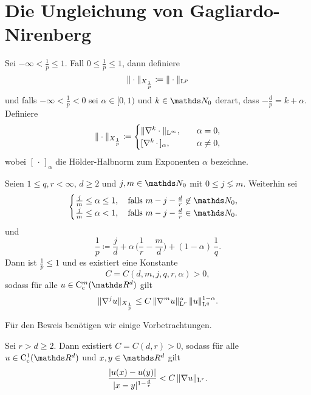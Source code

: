 \chapter{Die Ungleichung von Gagliardo-Nirenberg}

\begin{ntion}
  Sei $-\infty < \frac{1}{p} \leq 1$.
  Fall $0 \leq \frac{1}{p} \leq 1$, dann definiere
  $$
  \| \cdot \|_{X_{\frac{1}{p}}} \coloneqq \| \cdot \|_{\mathrm{L}^p}
  $$
  und falls $-\infty < \frac{1}{p} < 0$ sei $\alpha \in [0,1)$ und $k \in \N_0$ derart, dass $-\frac{d}{p} = k + \alpha$. Definiere
  $$
  \| \cdot \|_{X_{\frac{1}{p}}} \coloneqq 
  \begin{cases} 
    \| \nabla^k \cdot \|_{\mathrm{L}^\infty}, \quad &\alpha = 0, \\ [ \nabla^k \, \cdot \, ]_\alpha, \quad &\alpha \neq 0,
  \end{cases}
  $$
  wobei $[\,\cdot\,]_\alpha$ die Hölder-Halbnorm zum Exponenten $\alpha$ bezeichne.
\end{ntion}

\begin{hsatz}
  \label{hsatz:gagliardoNirenberg}
  Seien $1 \leq q,r < \infty$, $d \geq 2$ und $j,m \in \N_0$ mit $0 \leq j \lneq m$.
  Weiterhin sei
  $$
  \begin{cases}
    \frac{j}{m} \leq \alpha \leq 1, \quad \text{falls } m - j - \frac{d}{r} \not\in \N_0, \\
    \frac{j}{m} \leq \alpha < 1, \quad \text{falls } m - j - \frac{d}{r} \in \N_0.
  \end{cases}
    $$
    und
    $$
    \frac{1}{p} \coloneqq \frac{j}{d} + \alpha\, \Big( \frac{1}{r} - \frac{m}{d} \Big) + (1 - \alpha) \, \frac{1}{q}.
    $$
    Dann ist $\frac{1}{p} \leq 1$ und es existiert eine Konstante
    $$
    C = C(d,m,j,q,r,\alpha) > 0,
    $$
    sodass für alle $u \in \CC_{\cc}^m(\R^d)$ gilt
    $$
    \| \nabla^j u\|_{X_{\frac{1}{p}}} \leq C \, \|\nabla^m u\|_{\mathrm{L}^r}^\alpha \, \|u\|_{\mathrm{L}^q}^{1 - \alpha}.
    $$
\end{hsatz}

Für den Beweis benötigen wir einige Vorbetrachtungen.

\begin{lem}
  \label{lem:hoelderIneq}
  Sei $r > d \geq 2$.
  Dann existiert $C = C(d,r) > 0$, sodass für alle $u \in \CC_{\cc}^1(\R^d)$ und $x,y \in \R^d$ gilt
  $$
  \frac{\left| u(x) - u(y) \right|}{|x - y|^{1 - \frac{d}{r}}} < C \, \|\nabla u\|_{\mathrm{L}^r}.
  $$
\end{lem}

